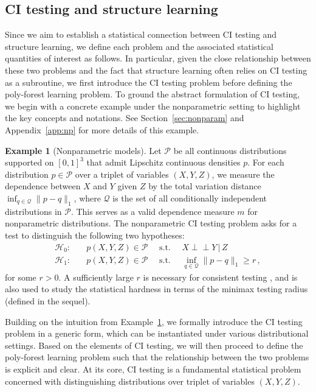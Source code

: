 \documentclass{article}
\theoremstyle{definition}
\theoremstyle{definition}
\newtheorem{example}{Example}
\theoremstyle{definition}
\theoremstyle{definition}
\theoremstyle{definition}
\theoremstyle{definition}
\theoremstyle{remark}
\theoremstyle{remark}
\newcommand{\st}{\text{ s.t. }}
\newcommand{\given}{\,|\,}
\newcommand{\indep}{\perp \!\!\! \perp }
\newcommand{\dpdm}{m}
\newcommand{\hone}{\mathcal{H}_1}
\newcommand{\hzero}{\mathcal{H}_0}
\begin{document}
\subsection{CI testing and structure learning}
Since we aim to establish a statistical connection between CI testing and structure learning, we define each problem and the associated statistical quantities of interest as follows. 
In particular, given the close relationship between these two problems and the fact that structure learning often relies on CI testing as a subroutine, we first introduce the CI testing problem before defining the poly-forest learning problem.
To ground the abstract formulation of CI testing, we begin with a concrete example under the nonparametric setting to highlight the key concepts and notations. See Section~\ref{sec:nonparam} and Appendix~\ref{app:np} for more details of this example.
\begin{example}[Nonparametric models]\label{ex:demo}
    Let $\mathcal{P}$ be all continuous distributions supported on $[0,1]^3$ that admit Lipschitz continuous densities $p$. 
    For each distribution $p\in\mathcal{P}$ over a triplet of variables $(X,Y,Z)$, we measure the dependence between $X$ and $Y$ given $Z$ by the total variation distance $\inf_{q\in\mathcal{Q}}\|p-q\|_1$, where $\mathcal{Q}$ is the set of all conditionally independent distributions in $\mathcal{P}$. This serves as a valid  dependence measure $\dpdm$ for nonparametric distributions.
    The nonparametric CI testing problem asks for a test to distinguish the following two hypotheses:
    \begin{align*}
    \hzero : &\quad  p(X,Y,Z)\in\mathcal{P} \quad  \st \quad X\indep Y\given Z \\
    \hone : & \quad  p(X,Y,Z)\in\mathcal{P} \quad  \st \quad \inf_{q\in\mathcal{Q}}\|p-q\|_1  \ge r \,,
    \end{align*}
    for some $r>0$. A sufficiently large $r$ is necessary for consistent testing \citep{shah2020hardness}, and is also used to study the statistical hardness in terms of the minimax testing radius (defined in the sequel).
\end{example}
Building on the intuition from Example~\ref{ex:demo}, we formally introduce the CI testing problem in a generic form, which can be instantiated under various distributional settings.
Based on the elements of CI testing, we will then proceed to define the poly-forest learning problem such that the relationship between the two problems is explicit and clear.
At its core, CI testing is a fundamental statistical problem concerned with distinguishing distributions over triplet of variables $(X,Y,Z)$.
\end{document}
